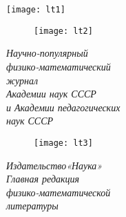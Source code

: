 \hspace*{-1.2cm} \texttt{[image: lt1]}
\vspace*{-1cm}
\begin{wrapfigure}[8]{l}{0.64\textwidth}
\hspace*{-0.4cm}\texttt{[image: lt2]}
\end{wrapfigure}

\begin{spacing}{0.7}
\vspace*{0.1cm}
\noindent\textit{Научно-популярный\\
физико-математический\\
журнал\\
Академии наук СССР\\
и Академии педагогических\\
наук СССР\\}

\begin{wrapfigure}[4]{l}{0.7\textwidth}
\centering
\vspace*{-0.6cm}\hspace*{10.7cm}\texttt{[image: lt3]}
\end{wrapfigure}

\noindent\textit{Издательство«Наука»\\
Главная редакция\\
физико-математической\\
литературы\\}
\newline
\newline
\end{spacing}
\vspace*{-0.7cm}

